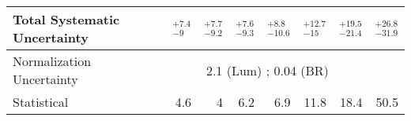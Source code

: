 \begin{table}[bth]
\begin{center}
\begin{tabular}{lrrrrrrr}
\hline\hline
Total Systematic Uncertainty & $^{+7.4}_{-9}$ & $^{+7.7}_{-9.2}$ & $^{+7.6}_{-9.3}$ & $^{+8.8}_{-10.6}$ & $^{+12.7}_{-15}$ & $^{+19.5}_{-21.4}$ & $^{+26.8}_{-31.9}$ \\%
\hline
Normalization Uncertainty & \multicolumn{6}{c}{  2.1 (Lum) ; 0.04 (BR) } \\
\hline %
Statistical & 4.6 & 4 & 6.2 & 6.9 & 11.8 & 18.4 & 50.5\\
\hline
\end{tabular}
\end{center}
\end{table}
